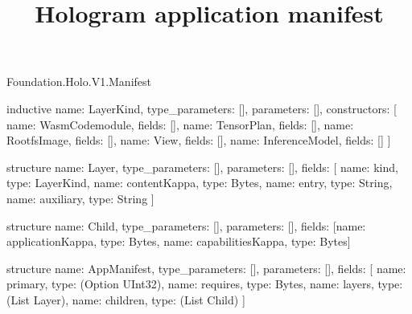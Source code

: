 \begin{lexlean}{Foundation.Holo.V1.Manifest}
\title{Hologram application manifest}
\begin{semanticmodule}
inductive{
  name: LayerKind,
  type_parameters: [],
  parameters: [],
  constructors: [
    {name: WasmCodemodule, fields: []},
    {name: TensorPlan, fields: []},
    {name: RootfsImage, fields: []},
    {name: View, fields: []},
    {name: InferenceModel, fields: []}
  ]
}

structure{
  name: Layer,
  type_parameters: [],
  parameters: [],
  fields: [
    {name: kind, type: LayerKind},
    {name: contentKappa, type: Bytes},
    {name: entry, type: String},
    {name: auxiliary, type: String}
  ]
}

structure{
  name: Child,
  type_parameters: [],
  parameters: [],
  fields: [{name: applicationKappa, type: Bytes}, {name: capabilitiesKappa, type: Bytes}]
}

structure{
  name: AppManifest,
  type_parameters: [],
  parameters: [],
  fields: [
    {name: primary, type: (Option UInt32)},
    {name: requires, type: Bytes},
    {name: layers, type: (List Layer)},
    {name: children, type: (List Child)}
  ]
}
\end{semanticmodule}
\end{lexlean}
